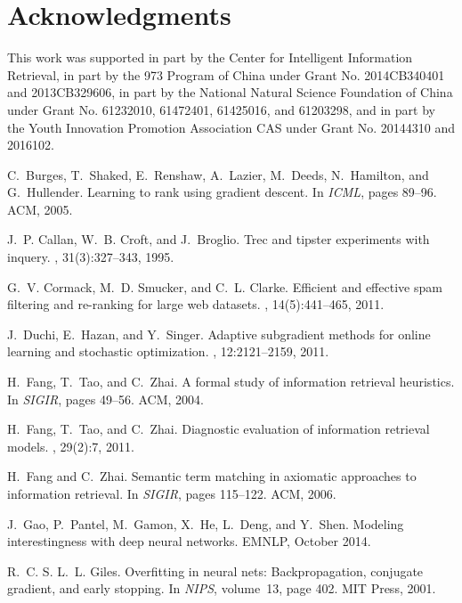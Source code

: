 \documentclass{sig-alternate-05-2015}
\begin{document}
\section{Acknowledgments}
This work was supported in part by the Center for Intelligent Information Retrieval, in part by the 973 Program of China under Grant No. 2014CB340401 and 2013CB329606, in part by the National Natural Science Foundation of China under Grant No. 61232010, 61472401, 61425016, and 61203298, and in part by the Youth Innovation Promotion Association CAS under Grant No. 20144310 and 2016102.



\begin{thebibliography}{10}

C.~Burges, T.~Shaked, E.~Renshaw, A.~Lazier, M.~Deeds, N.~Hamilton, and
  G.~Hullender.
\newblock Learning to rank using gradient descent.
\newblock In {\em ICML}, pages 89--96. ACM, 2005.

J.~P. Callan, W.~B. Croft, and J.~Broglio.
\newblock Trec and tipster experiments with inquery.
, 31(3):327--343, 1995.

G.~V. Cormack, M.~D. Smucker, and C.~L. Clarke.
\newblock Efficient and effective spam filtering and re-ranking for large web
  datasets.
, 14(5):441--465, 2011.

J.~Duchi, E.~Hazan, and Y.~Singer.
\newblock Adaptive subgradient methods for online learning and stochastic
  optimization.
, 12:2121--2159, 2011.

H.~Fang, T.~Tao, and C.~Zhai.
\newblock A formal study of information retrieval heuristics.
\newblock In {\em SIGIR}, pages 49--56. ACM, 2004.

H.~Fang, T.~Tao, and C.~Zhai.
\newblock Diagnostic evaluation of information retrieval models.
, 29(2):7, 2011.

H.~Fang and C.~Zhai.
\newblock Semantic term matching in axiomatic approaches to information
  retrieval.
\newblock In {\em SIGIR}, pages 115--122. ACM, 2006.

J.~Gao, P.~Pantel, M.~Gamon, X.~He, L.~Deng, and Y.~Shen.
\newblock Modeling interestingness with deep neural networks.
\newblock EMNLP, October 2014.

R.~C. S. L.~L. Giles.
\newblock Overfitting in neural nets: Backpropagation, conjugate gradient, and
  early stopping.
\newblock In {\em NIPS}, volume~13, page 402. MIT Press, 2001.


\end{thebibliography}
\end{document}
